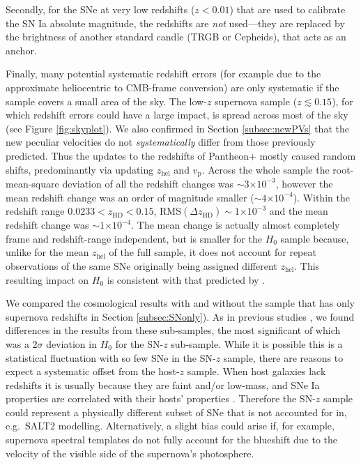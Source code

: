 \documentclass[
  journal=pasa,
  manuscript=research-paper,
  year=2022,
]{cup-journal}
\newcommand{\zHD}[1]{\ensuremath{z_{\text{HD}}^{\mathrm{#1}}}}
\newcommand\zhel{\ensuremath{z_{\text{hel}}}}
\newcommand{\vp}{\ensuremath{v_{\text{p}}}}
\newcommand{\tten}[1]{\ensuremath{\times 10^{#1}}}
\begin{document}
Secondly, for the SNe at very low redshifts ($z<0.01$) that are used to calibrate the SN Ia absolute magnitude, the redshifts are {\em not} used---they are replaced by the brightness of another standard candle (TRGB or Cepheids), that acts as an anchor.

Finally, many potential systematic redshift errors (for example due to the approximate heliocentric to CMB-frame conversion) are only systematic if the sample covers a small area of the sky. 
The low-$z$ supernova sample ($z\lesssim0.15$), for which redshift errors could have a large impact, is spread across most of the sky (see Figure \ref{fig:skyplot}).
We also confirmed in Section \ref{subsec:newPVs} that the new peculiar velocities do not \textit{systematically} differ from those previously predicted.
Thus the updates to the redshifts of Pantheon+ mostly caused random shifts, predominantly via updating \zhel{} and \vp{}.
Across the whole sample the root-mean-square deviation of all the redshift changes was $\sim3\tten{-3}$, however the mean redshift change was an order of magnitude smaller ($\sim 4\tten{-4}$).  
Within the redshift range $0.0233<\zHD{}<0.15$, RMS$(\Delta\zHD{})\sim 1\tten{-3}$ and the mean redshift change was $\sim 1\tten{-4}$.
The mean change is actually almost completely frame and redshift-range independent, but is smaller for the $H_0$ sample because, unlike for the mean \zhel{} of the full sample, it does not account for repeat observations of the same SNe originally being assigned different \zhel{}.
This resulting impact on $H_0$ is consistent with that predicted by \citet[][see the green dashed line in their Figure 4]{Davis2019}.  

We compared the cosmological results with and without the sample that has only supernova redshifts in Section \ref{subsec:SNonly}).  
As in previous studies \citep[e.g.][]{Steinhardt2020}, we found differences in the results from these sub-samples, the most significant of which was a $2\sigma$ deviation in $H_0$ for the SN-$z$ sub-sample.  
While it is possible this is a statistical fluctuation with so few SNe in the SN-$z$ sample, there are reasons to expect a systematic offset from the host-$z$ sample. 
When host galaxies lack redshifts it is usually because they are faint and/or low-mass, and SNe Ia properties are correlated with their hosts' properties \citep[e.g.][]{Sullivan2006,Smith2020b,Wiseman2020}.
Therefore the SN-$z$ sample could represent a physically different subset of SNe that is not accounted for in, e.g.~SALT2 modelling.
Alternatively, a slight bias could arise if, for example, supernova spectral templates do not fully account for the blueshift due to the velocity of the visible side of the supernova's photosphere. 
\end{document}

